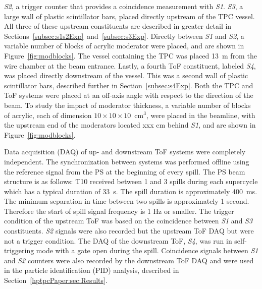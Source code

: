 \textit{S2}, a trigger counter that provides a coincidence measurement with \textit{S1}.
\textit{S3}, a large wall of plastic scintillator bars, placed directly upstream of the TPC vessel.
All three of these upstream constituents are described in greater detail in Sections~\ref{subsec:s1s2Exp}~and~\ref{subsec:s3Exp}.
Directly between \textit{S1} and \textit{S2}, a variable number of blocks of acrylic moderator were placed, and are shown in Figure~\ref{fig:modblocks}.
The vessel containing the TPC was placed 13~m from the wire chamber at the beam entrance.
Lastly, a fourth ToF constituent, labeled \textit{S4}, was placed directly downstream of the vessel.
This was a second wall of plastic scintillator bars, described further in Section~\ref{subsec:s4Exp}.
Both the TPC and ToF systems were placed at an off-axis angle with respect to the direction of the beam.
To study the impact of moderator thickness, a variable number of blocks of acrylic, each of dimension $10\times10\times10$~cm$^3$, were placed in the beamline, with the upstream end of the moderators located xxx cm behind \textit{S1}, and are shown in Figure~\ref{fig:modblocks}.


Data acquisition (DAQ) of up- and downstream ToF systems were completely independent.
The synchronization between systems was performed offline using the reference signal from the PS at the beginning of every spill.
The PS beam structure is as follows: T10 received between 1 and 3 spills during each supercycle which has a typical duration of 33~s.
The spill duration is approximately 400~ms.
The minimum separation in time between two spills is approximately 1 second.
Therefore the start of spill signal frequency is 1 Hz or smaller.
The trigger condition of the upstream ToF was based on the coincidence between \textit{S1} and \textit{S3} constituents.
\textit{S2} signals were also recorded but the upstream ToF DAQ but were not a trigger condition.
The DAQ of the downstream ToF, \textit{S4}, was run in self-triggering mode with a gate open during the spill.
Coincidence signals between \textit{S1} and \textit{S2} counters were also recorded by the downstream ToF DAQ and were used in the particle identification (PID) analysis, described in Section~\ref{hptpcPaper:sec:Results}.  

